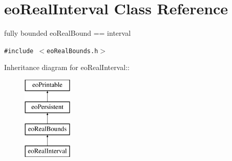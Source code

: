 \section{eo\-Real\-Interval Class Reference}
\label{classeo_real_interval}
fully bounded eo\-Real\-Bound == interval  


{\tt \#include $<$eo\-Real\-Bounds.h$>$}

Inheritance diagram for eo\-Real\-Interval::\begin{figure}[H]
\begin{center}
\leavevmode
\includegraphics[height=4cm]{classeo_real_interval}
\end{center}
\end{figure}
